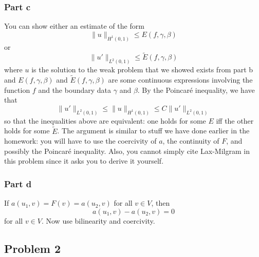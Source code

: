 \documentclass{article}
\theoremstyle{definition}
\theoremstyle{plain}
\begin{document}
\subsubsection{Part c}
You can show either an estimate of the form
\begin{equation}
    \|u\|_{H^1(0,1)} \leq E(f, \gamma, \beta)
\end{equation}
or 
\begin{equation}
    \|u'\|_{L^2(0,1)} \leq \widetilde E(f,\gamma,\beta)
\end{equation}
where $u$ is the solution to the weak problem that we showed exists from part b and $E(f,\gamma,\beta)$ and $\widetilde E(f,\gamma,\beta)$ are some continuous expressions involving the function $f$ and the boundary data $\gamma$ and $\beta$.
By the Poincar\'e inequality, we have that 
\begin{equation}
    \|u'\|_{L^2(0,1)} \leq \|u\|_{H^1(0,1)} \leq C\|u'\|_{L^2(0,1)}
\end{equation}
so that the inequalities above are equivalent: one holds for some $E$ iff the other holds for some $\widetilde E$.
The argument is similar to stuff we have done earlier in the homework: you will have to use the coercivity of $a$, the continuity of $F$, and possibly the Poincar\'e inequality.
Also, you cannot simply cite Lax-Milgram in this problem since it asks you to derive it yourself.

\subsubsection{Part d}
If $a(u_1,v) = F(v) = a(u_2,v)$ for all $v \in V$, then
\begin{equation}
    a(u_1,v) - a(u_2,v) = 0
\end{equation}
for all $v \in V$.
Now use bilinearity and coercivity.

\subsection{Problem 2}
\end{document}
